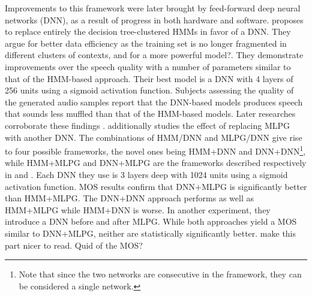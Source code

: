 \documentclass[a4paper, oneside]{article}
\begin{document}
Improvements to this framework were later brought by feed-forward deep neural networks (DNN), as a result of progress in both hardware and software. \cite{SPSSDNN} proposes to replace entirely the decision tree-clustered HMMs in favor of a DNN. They argue for better data efficiency as the training set is no longer fragmented in different clusters of contexts\color{red}, and for a more powerful model?\color{black}. They demonstrate improvements over the speech quality with a number of parameters similar to that of the HMM-based approach. Their best model is a DNN with 4 layers of 256 units using a sigmoid activation function. Subjects assessing the quality of the generated audio samples report that the DNN-based models produces speech that sounds less muffled than that of the HMM-based models. Later researches corroborate these findings \cite{OnTheTrainingAspects}. \cite{Hashimoto-2015} additionally studies the effect of replacing MLPG with another DNN. The combinations of HMM/DNN and MLPG/DNN give rise to four possible frameworks, the novel ones being HMM+DNN and DNN+DNN\footnote{Note that since the two networks are consecutive in the framework, they can be considered a single network.}, while HMM+MLPG and DNN+MLPG are the frameworks described respectively in \cite{Tokuda-2013} and \cite{SPSSDNN}. Each DNN they use is 3 layers deep with 1024 units using a sigmoid activation function. MOS results confirm that DNN+MLPG is significantly better than HMM+MLPG. The DNN+DNN approach performs as well as HMM+MLPG while HMM+DNN is worse. In another experiment, they introduce a DNN before and after MLPG. While both approaches yield a MOS similar to DNN+MLPG, neither are statistically significantly better. \color{red} make this part nicer to read. Quid of the MOS?\color{black}
\end{document}
